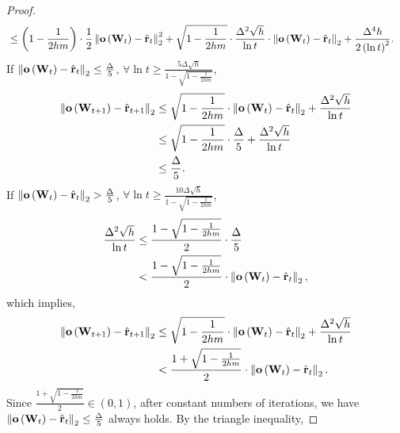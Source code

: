 \begin{proof}
\begin{equation*}
\begin{split}
    &\le \left( 1 - \frac{1}{2 h m } \right) \cdot \frac{1}{2} \left\| {\mathbf{o}}\left( {\mathbf{W}}_t \right) - \hat{{\mathbf{r}}}_t\right\|_2^2 + \sqrt{1 - \frac{1}{2 h m } } \cdot \frac{\Delta^2 \sqrt{h}}{\ln{t}} \cdot \left\| {\mathbf{o}}\left( {\mathbf{W}}_t \right) - \hat{{\mathbf{r}}}_t\right\|_2 + \frac{\Delta^4 h}{2 \left( \ln{t} \right)^2 }.
\end{split}
\end{equation*}
If $\left\| {\mathbf{o}}\left( {\mathbf{W}}_t \right) - \hat{{\mathbf{r}}}_t\right\|_2 \le \frac{\Delta}{5}$, $\forall \ln{t} \ge \frac{5 \Delta \sqrt{h}}{1 - \sqrt{1 - \frac{1}{2 h m}}}$,
\begin{equation*}
\begin{split}
    \left\| {\mathbf{o}}\left( {\mathbf{W}}_{t+1} \right) - \hat{{\mathbf{r}}}_{t+1}\right\|_2 &\le \sqrt{1 - \frac{1}{2 h m}} \cdot \left\| {\mathbf{o}}\left( {\mathbf{W}}_t \right) - \hat{{\mathbf{r}}}_t\right\|_2 + \frac{\Delta^2 \sqrt{h}}{\ln{t}} \\
    &\le \sqrt{1 - \frac{1}{2 h m}} \cdot \frac{\Delta}{5} + \frac{\Delta^2 \sqrt{h}}{\ln{t}} \\
    &\le \frac{\Delta}{5}.
\end{split}
\end{equation*}
If $\left\| {\mathbf{o}}\left( {\mathbf{W}}_t \right) - \hat{{\mathbf{r}}}_t\right\|_2 > \frac{\Delta}{5}$, $\forall \ln{t} \ge \frac{10 \Delta \sqrt{h}}{1 - \sqrt{1 - \frac{1}{2 h m}}}$,
\begin{equation*}
\begin{split}
    \frac{\Delta^2 \sqrt{h}}{\ln{t}} &\le \frac{1 - \sqrt{1 - \frac{1}{2 h m}}}{2} \cdot \frac{\Delta}{5} \\
    &< \frac{1 - \sqrt{1 - \frac{1}{2 h m}}}{2} \cdot \left\| {\mathbf{o}}\left( {\mathbf{W}}_t \right) - \hat{{\mathbf{r}}}_t\right\|_2,
\end{split}
\end{equation*}
which implies,
\begin{equation*}
\begin{split}
    \left\| {\mathbf{o}}\left( {\mathbf{W}}_{t+1} \right) - \hat{{\mathbf{r}}}_{t+1}\right\|_2 &\le \sqrt{1 - \frac{1}{2 h m}} \cdot \left\| {\mathbf{o}}\left( {\mathbf{W}}_t \right) - \hat{{\mathbf{r}}}_t\right\|_2 + \frac{\Delta^2 \sqrt{h}}{\ln{t}} \\
    &< \frac{1 + \sqrt{1 - \frac{1}{2 h m}}}{2} \cdot \left\| {\mathbf{o}}\left( {\mathbf{W}}_t \right) - \hat{{\mathbf{r}}}_t\right\|_2.
\end{split}
\end{equation*}
Since $\frac{1 + \sqrt{1 - \frac{1}{2 h m}}}{2} \in \left(0, 1\right)$, after constant numbers of iterations, we have $\left\| {\mathbf{o}}\left( {\mathbf{W}}_t \right) - \hat{{\mathbf{r}}}_t\right\|_2 \le \frac{\Delta}{5}$ always holds. By the triangle inequality,

\end{proof}
